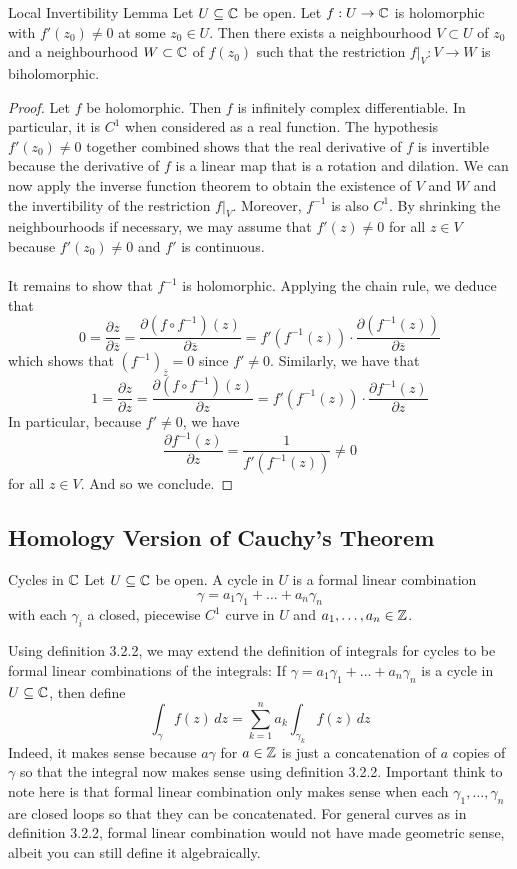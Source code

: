 \documentclass[a4paper]{article}
\begin{document}
\begin{lmm}{Local Invertibility Lemma}{} Let $U\subseteq\mathbb{C}$ be open. Let $f:U\to\mathbb{C}$ is holomorphic with $f'(z_0)\neq 0$ at some $z_0\in U$. Then there exists a neighbourhood $V\subset U$ of $z_0$ and a neighbourhood $W\subset\mathbb{C}$ of $f(z_0)$ such that the restriction $f|_V:V\to W$ is biholomorphic. \tcbline
\begin{proof}
Let $f$ be holomorphic. Then $f$ is infinitely complex differentiable. In particular, it is $C^1$ when considered as a real function. The hypothesis $f'(z_0)\neq 0$ together combined shows that the real derivative of $f$ is invertible because the derivative of $f$ is a linear map that is a rotation and dilation. We can now apply the inverse function theorem to obtain the existence of $V$ and $W$ and the invertibility of the restriction $f|_V$. Moreover, $f^{-1}$ is also $C^1$. By shrinking the neighbourhoods if necessary, we may assume that $f'(z)\neq 0$ for all $z\in V$ because $f'(z_0)\neq 0$ and $f'$ is continuous. \\~\\

It remains to show that $f^{-1}$ is holomorphic. Applying the chain rule, we deduce that $$0=\frac{\partial z}{\partial\overline{z}}=\frac{\partial (f\circ f^{-1})(z)}{\partial\overline{z}}=f'(f^{-1}(z))\cdot\frac{\partial(f^{-1}(z))}{\partial\overline{z}}$$ which shows that $(f^{-1})_{\overline{z}}=0$ since $f'\neq 0$. Similarly, we have that $$1=\frac{\partial z}{\partial z}=\frac{\partial (f\circ f^{-1})(z)}{\partial z}=f'(f^{-1}(z))\cdot\frac{\partial f^{-1}(z)}{\partial z}$$ In particular, because $f'\neq 0$, we have $$\frac{\partial f^{-1}(z)}{\partial z}=\frac{1}{f'(f^{-1}(z))}\neq 0$$ for all $z\in V$. And so we conclude. 
\end{proof}
\end{lmm}

\subsection{Homology Version of Cauchy's Theorem}
\begin{defn}{Cycles in $\mathbb{C}$}{} Let $U\subseteq\mathbb{C}$ be open. A cycle in $U$ is a formal linear combination $$\gamma=a_1\gamma_1+\dots+a_n\gamma_n$$ with each $\gamma_i$ a closed, piecewise $C^1$ curve in $U$ and $a_1,\dots,a_n\in\mathbb{Z}$. 
\end{defn}

Using definition 3.2.2, we may extend the definition of integrals for cycles to be formal linear combinations of the integrals: If $\gamma=a_1\gamma_1+\dots+a_n\gamma_n$ is a cycle in $U\subseteq\mathbb{C}$, then define $$\int_\gamma f(z)\,dz=\sum_{k=1}^na_k\int_{\gamma_k}f(z)\,dz$$ Indeed, it makes sense because $a\gamma$ for $a\in\mathbb{Z}$ is just a concatenation of $a$ copies of $\gamma$ so that the integral now makes sense using definition 3.2.2. Important think to note here is that formal linear combination only makes sense when each $\gamma_1,\dots,\gamma_n$ are closed loops so that they can be concatenated. For general curves as in definition 3.2.2, formal linear combination would not have made geometric sense, albeit you can still define it algebraically. 
\end{document}
